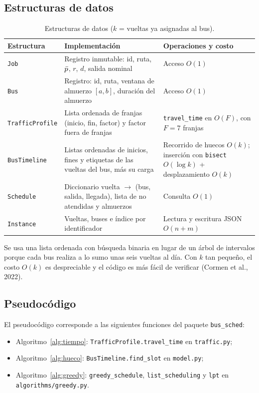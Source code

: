 \subsection{Estructuras de datos}
\begin{table}[H]
\centering\small
\caption{Estructuras de datos ($k$ = vueltas ya asignadas al bus).}
\begin{tabularx}{\textwidth}{L{2.6cm}YL{4.6cm}}
\toprule
Estructura & Implementación & Operaciones y costo \\
\midrule
\texttt{Job} & Registro inmutable: id, ruta, $\bar{p}$, $r$, $d$, salida nominal & Acceso $O(1)$ \\
\texttt{Bus} & Registro: id, ruta, ventana de almuerzo $[a, b]$, duración del almuerzo & Acceso $O(1)$ \\
\texttt{TrafficProfile} & Lista ordenada de franjas (inicio, fin, factor) y factor fuera de franjas & \texttt{travel\_time} en $O(F)$, con $F = 7$ franjas \\
\texttt{BusTimeline} & Listas ordenadas de inicios, fines y etiquetas de las vueltas del bus, más su carga & Recorrido de huecos $O(k)$; inserción con \texttt{bisect} $O(\log k)$ + desplazamiento $O(k)$ \\
\texttt{Schedule} & Diccionario vuelta $\to$ (bus, salida, llegada), lista de no atendidas y almuerzos & Consulta $O(1)$ \\
\texttt{Instance} & Vueltas, buses e índice por identificador & Lectura y escritura JSON $O(n + m)$ \\
\bottomrule
\end{tabularx}
\end{table}

Se usa una lista ordenada con búsqueda binaria en lugar de un árbol de intervalos porque cada bus realiza a lo sumo unas seis vueltas al día. Con $k$ tan pequeño, el costo $O(k)$ es despreciable y el código es más fácil de verificar (Cormen et al., 2022).

\subsection{Pseudocódigo}
El pseudocódigo corresponde a las siguientes funciones del paquete \texttt{bus\_sched}:
\begin{itemize}
  \item Algoritmo~\ref{alg:tiempo}: \texttt{TrafficProfile.travel\_time} en \texttt{traffic.py};
  \item Algoritmo~\ref{alg:hueco}: \texttt{BusTimeline.find\_slot} en \texttt{model.py};
  \item Algoritmo~\ref{alg:greedy}: \texttt{greedy\_schedule}, \texttt{list\_scheduling} y \texttt{lpt} en \texttt{algorithms/greedy.py}.
\end{itemize}

